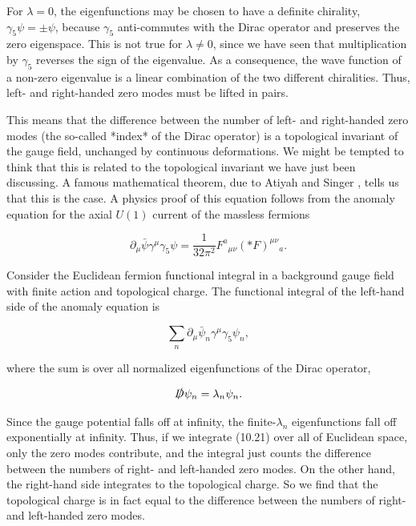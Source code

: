 For $\lambda=0$, the eigenfunctions may be chosen to have a definite chirality,
$\gamma_5\psi=\pm\psi$, because $\gamma_5$ anti-commutes with the Dirac
operator and preserves the zero eigenspace. This is not true for $\lambda\ne0$,
since we have seen that multiplication by $\gamma_5$ reverses the sign of the
eigenvalue. As a consequence, the wave function of a non-zero eigenvalue is a
linear combination of the two different chiralities. Thus, left- and
right-handed zero modes must be lifted in pairs.

This means that the difference between the number of left- and right-handed zero
modes (the so-called *index* of the Dirac operator) is a topological invariant of
the gauge field, unchanged by continuous deformations. We might be tempted to
think that this is related to the topological invariant we have just been
discussing. A famous mathematical theorem, due to Atiyah and Singer
\cite{banks-ref-143,banks-ref-144,banks-ref-145,banks-ref-146}, tells us that
this is the case. A physics proof of this equation follows from the anomaly
equation for the axial $U(1)$ current of the massless fermions

\begin{equation}
  \partial_\mu\bar\psi\gamma^\mu\gamma_5\psi
  =\frac{1}{32\pi^2}F^a{}_{\mu\nu}(\ast F)^{\mu\nu}{}_{a}.
  \label{eq:10.20}
\end{equation}

Consider the Euclidean fermion functional integral in a background gauge field
with finite action and topological charge. The functional integral of the
left-hand side of the anomaly equation is

\begin{equation}
  \sum_n\partial_\mu\bar\psi_n\gamma^\mu\gamma_5\psi_n,
  \label{eq:10.21}
\end{equation}

where the sum is over all normalized eigenfunctions of the Dirac operator,

\begin{equation}
  \slashed D\psi_n=\lambda_n\psi_n.
  \label{eq:10.22}
\end{equation}

Since the gauge potential falls off at infinity, the finite-$\lambda_n$
eigenfunctions fall off exponentially at infinity. Thus, if we integrate (10.21)
over all of Euclidean space, only the zero modes contribute, and the integral
just counts the difference between the numbers of right- and left-handed zero
modes. On the other hand, the right-hand side integrates to the topological
charge. So we find that the topological charge is in fact equal to the difference
between the numbers of right- and left-handed zero modes.

